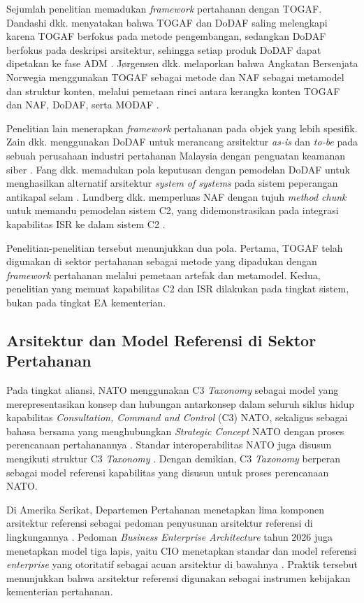 Sejumlah penelitian memadukan \textit{framework} pertahanan dengan TOGAF. Dandashi dkk. menyatakan bahwa TOGAF dan DoDAF saling melengkapi karena TOGAF berfokus pada metode pengembangan, sedangkan DoDAF berfokus pada deskripsi arsitektur, sehingga setiap produk DoDAF dapat dipetakan ke fase ADM \cite{Dandashi2006}. Jørgensen dkk. melaporkan bahwa Angkatan Bersenjata Norwegia menggunakan TOGAF sebagai metode dan NAF sebagai metamodel dan struktur konten, melalui pemetaan rinci antara kerangka konten TOGAF dan NAF, DoDAF, serta MODAF \cite{Jorgensen2011}.

Penelitian lain menerapkan \textit{framework} pertahanan pada objek yang lebih spesifik. Zain dkk. menggunakan DoDAF untuk merancang arsitektur \textit{as-is} dan \textit{to-be} pada sebuah perusahaan industri pertahanan Malaysia dengan penguatan keamanan siber \cite{Zain2023}. Fang dkk. memadukan pola keputusan dengan pemodelan DoDAF untuk menghasilkan alternatif arsitektur \textit{system of systems} pada sistem peperangan antikapal selam \cite{Fang2024}. Lundberg dkk. memperluas NAF dengan tujuh \textit{method chunk} untuk memandu pemodelan sistem C2, yang didemonstrasikan pada integrasi kapabilitas ISR ke dalam sistem C2 \cite{Lundberg2026}.

Penelitian-penelitian tersebut menunjukkan dua pola. Pertama, TOGAF telah digunakan di sektor pertahanan sebagai metode yang dipadukan dengan \textit{framework} pertahanan melalui pemetaan artefak dan metamodel. Kedua, penelitian yang memuat kapabilitas C2 dan ISR dilakukan pada tingkat sistem, bukan pada tingkat EA kementerian.

\subsection{Arsitektur dan Model Referensi di Sektor Pertahanan}
\label{sec:II.8.2}

Pada tingkat aliansi, NATO menggunakan C3 \textit{Taxonomy} sebagai model yang merepresentasikan konsep dan hubungan antarkonsep dalam seluruh siklus hidup kapabilitas \textit{Consultation, Command and Control} (C3) NATO, sekaligus sebagai bahasa bersama yang menghubungkan \textit{Strategic Concept} NATO dengan proses perencanaan pertahanannya \cite{NATOC3Taxonomy}. Standar interoperabilitas NATO juga disusun mengikuti struktur C3 \textit{Taxonomy} \cite{NATONISP}. Dengan demikian, C3 \textit{Taxonomy} berperan sebagai model referensi kapabilitas yang disusun untuk proses perencanaan NATO.

Di Amerika Serikat, Departemen Pertahanan menetapkan lima komponen arsitektur referensi sebagai pedoman penyusunan arsitektur referensi di lingkungannya \cite{DoDCIO2010RA}. Pedoman \textit{Business Enterprise Architecture} tahun 2026 juga menetapkan model tiga lapis, yaitu CIO\label{sk:CIO} menetapkan standar dan model referensi \textit{enterprise} yang otoritatif sebagai acuan arsitektur di bawahnya \cite{DoWBEA2026}. Praktik tersebut menunjukkan bahwa arsitektur referensi digunakan sebagai instrumen kebijakan kementerian pertahanan.

